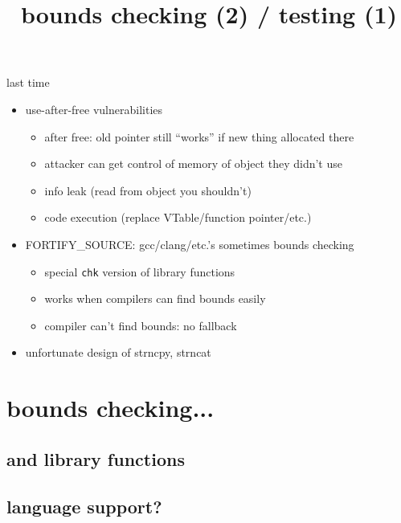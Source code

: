 \graphicspath{{./figures/}}
\title{bounds checking (2) / testing (1)}
\date{}

\begin{frame}
    \titlepage
\end{frame}

\begin{frame}{last time}
    \begin{itemize}
    \item use-after-free vulnerabilities
        \begin{itemize}
        \item after free: old pointer still ``works'' if new thing allocated there
        \item attacker can get control of memory of object they didn't use
        \item info leak (read from object you shouldn't)
        \item code execution (replace VTable/function pointer/etc.)
        \end{itemize}
    \item FORTIFY\_SOURCE: gcc/clang/etc.'s sometimes bounds checking
        \begin{itemize}
        \item special \texttt{chk} version of library functions
        \item works when compilers can find bounds easily
        \item compiler can't find bounds: no fallback
        \end{itemize}
    \item unfortunate design of strncpy, strncat
    \end{itemize}
\end{frame}

\usetikzlibrary{arrows.meta,calc,patterns}
\section{bounds checking...}
\subsection{and library functions}


\subsection{language support?}

